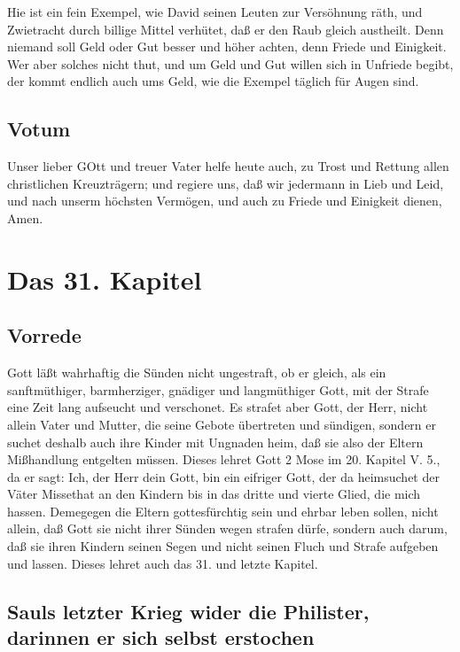 Hie ist ein fein Exempel, wie David seinen Leuten zur Versöhnung räth, und Zwietracht durch billige Mittel verhütet, daß er den Raub gleich austheilt. Denn niemand soll Geld oder Gut besser und höher achten, denn Friede und Einigkeit. Wer aber solches nicht thut, und um Geld und Gut willen sich in Unfriede begibt, der kommt endlich auch ums Geld, wie die Exempel täglich für Augen sind.

\section{Votum}

Unser lieber GOtt und treuer Vater helfe heute auch, zu Trost und Rettung allen christlichen Kreuzträgern; und regiere uns, daß wir jedermann in Lieb und Leid, und nach unserm höchsten Vermögen, und auch zu Friede und Einigkeit dienen, Amen.

\chapter{Das 31. Kapitel}

\section{Vorrede}

Gott läßt wahrhaftig die Sünden nicht ungestraft, ob er gleich, als ein sanftmüthiger, barmherziger, gnädiger und langmüthiger Gott, mit der Strafe eine Zeit lang aufseucht und verschonet. Es strafet aber Gott, der Herr, nicht allein Vater und Mutter, die seine Gebote übertreten und sündigen, sondern er suchet deshalb auch ihre Kinder mit Ungnaden heim, daß sie also der Eltern Mißhandlung entgelten müssen. Dieses lehret Gott 2 Mose im 20. Kapitel V. 5., da er sagt: Ich, der Herr dein Gott, bin ein eifriger Gott, der da heimsuchet der Väter Missethat an den Kindern bis in das dritte und vierte Glied, die mich hassen. Demegegen die Eltern gottesfürchtig sein und ehrbar leben sollen, nicht allein, daß Gott sie nicht ihrer Sünden wegen strafen dürfe, sondern auch darum, daß sie ihren Kindern seinen Segen und nicht seinen Fluch und Strafe aufgeben und lassen. Dieses lehret auch das 31. und letzte Kapitel.

\section[Sauls letzter Krieg wider die Philister, darinnen er]{Sauls letzter Krieg wider die Philister, darinnen er sich selbst erstochen}

